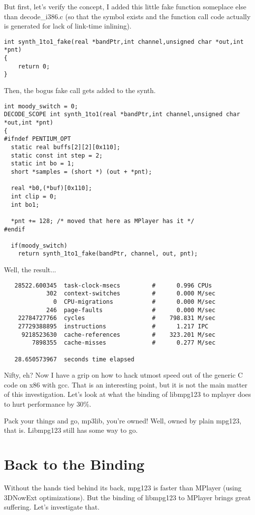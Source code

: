 \documentclass[a4paper,12pt]{scrartcl}
\begin{document}
But first, let's verify the concept, I added this little fake function someplace else than decode\_i386.c (so that the symbol exists and the function call code actually is generated for lack of link-time inlining).
\begin{verbatim}
int synth_1to1_fake(real *bandPtr,int channel,unsigned char *out,int *pnt)
{
	return 0;
}
\end{verbatim}
Then, the bogus fake call gets added to the synth.
\begin{verbatim}
int moody_switch = 0;
DECODE_SCOPE int synth_1to1(real *bandPtr,int channel,unsigned char *out,int *pnt)
{
#ifndef PENTIUM_OPT
  static real buffs[2][2][0x110];
  static const int step = 2;
  static int bo = 1;
  short *samples = (short *) (out + *pnt);

  real *b0,(*buf)[0x110];
  int clip = 0; 
  int bo1;

  *pnt += 128; /* moved that here as MPlayer has it */
#endif

  if(moody_switch)
    return synth_1to1_fake(bandPtr, channel, out, pnt);
\end{verbatim}
Well, the result...
\begin{verbatim}
   28522.600345  task-clock-msecs         #      0.996 CPUs 
            302  context-switches         #      0.000 M/sec
              0  CPU-migrations           #      0.000 M/sec
            246  page-faults              #      0.000 M/sec
    22784727766  cycles                   #    798.831 M/sec
    27729388895  instructions             #      1.217 IPC  
     9218523630  cache-references         #    323.201 M/sec
        7898355  cache-misses             #      0.277 M/sec

   28.650573967  seconds time elapsed
\end{verbatim}

Nifty, eh? Now I have a grip on how to hack utmost speed out of the generic C code on x86 with gcc. That is an interesting point, but it is not the main matter of this investigation.
Let's look at what the binding of libmpg123 to mplayer does to hurt performance by 30\%.

Pack your things and go, mp3lib, you're owned! Well, owned by plain mpg123, that is. Libmpg123 still has some way to go.

\section{Back to the Binding}

Without the hands tied behind its back, mpg123 is faster than MPlayer (using 3DNowExt optimizations).
But the binding of libmpg123 to MPlayer brings great suffering.
Let's investigate that.
\end{document}
